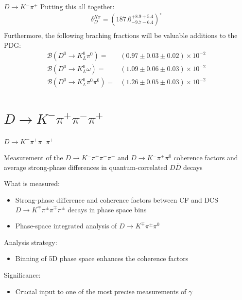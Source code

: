 \documentclass{beamer}
\begin{document}
\begin{frame}{$D\to K^-\pi^+$}
  \vspace{0.0cm}
  {\large Putting this all together:}
  \begin{align*}
    \delta_D^{K\pi} = (187.6^{+8.9+5.4}_{-9.7-6.4})^\circ \\
  \end{align*}
  {\large Furthermore, the following braching fractions will be valuable additions to the PDG:}
  \begin{align*}
    \mathcal{B}(D^0\to K_L^0\pi^0) =& (0.97 \pm 0.03 \pm 0.02)\times10^{-2} \\
    \mathcal{B}(D^0\to K_L^0\omega) =& (1.09 \pm 0.06 \pm 0.03)\times10^{-2} \\
    \mathcal{B}(D^0\to K_L^0\pi^0\pi^0) =& (1.26 \pm 0.05 \pm 0.03)\times10^{-2}
  \end{align*}
\end{frame}

\section{\texorpdfstring{$D\to K^-\pi^+\pi^-\pi^+$}{D2Kpipipi}}
\begin{frame}{$D\to K^-\pi^+\pi^-\pi^+$}
\begin{tcolorbox}[enhanced,frame style image=blueshade_cropped.png,
  opacityback=0.75,opacitybacktitle=0.25,
  colback=blue!5!white,colframe=blue!75!black,
  title=\color{white}{\href{https://link.springer.com/article/10.1007/JHEP05(2021)164}{\color{white}{JHEP \textbf{5} (2021) 164}}}]
  {\Large Measurement of the $D\to K^-\pi^+\pi^-\pi^-$ and $D\to K^-\pi^+\pi^0$ coherence factors and average strong-phase differences in quantum-correlated $D\bar{D}$ decays}
\end{tcolorbox}
  What is measured:
  \begin{itemize}
    \item{Strong-phase difference and coherence factors between CF and DCS $D\to K^\mp\pi^\pm\pi^\mp\pi^\pm$ decays in phase space bins}
    \item{Phase-space integrated analysis of $D\to K^\mp\pi^\pm\pi^0$}
  \end{itemize}
  Analysis strategy:
  \begin{itemize}
    \item{Binning of 5D phase space enhances the coherence factors}
  \end{itemize}
  Significance:
  \begin{itemize}
    \item{Crucial input to one of the most precise measurements of $\gamma$}
  \end{itemize}
\end{frame}
\end{document}
